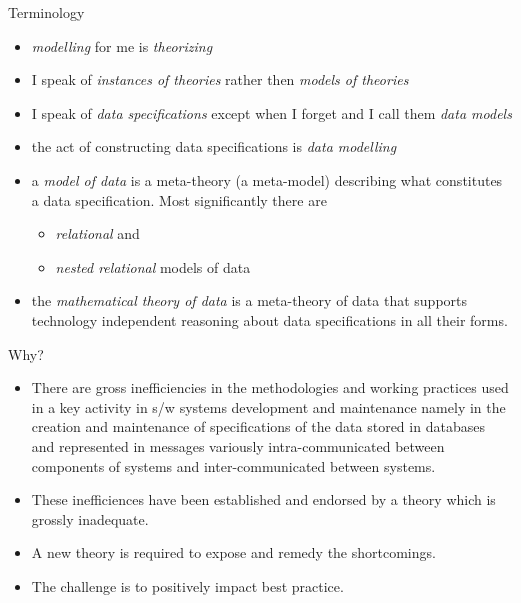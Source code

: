 \begin{frame}
\titlepage
{}
\end{frame} 


\begin{frame}{Terminology}
\begin{itemize}
\item \textit{modelling} for me is \textit{theorizing}
\item I speak of \textit{instances of theories}  rather then \textit{models of theories}
\item I speak of \textit{data specifications} except when I forget and I call them \textit{data models}
\item the act of constructing data specifications is \textit{data modelling}
\item a \textit{model of data} is a meta-theory (a meta-model) describing what constitutes a data specification. Most significantly there are
\begin{itemize}
\item \textit{relational} and 
\item \textit{nested relational} 
models of data
\end{itemize}
\item the \textit{mathematical theory of data} is a meta-theory of data that supports technology  independent reasoning about data specifications in all their forms.
\end{itemize}
\end{frame}

\begin{frame}{Why?}
\begin{itemize}[<+->]
  \item There are gross inefficiencies in the methodologies and working practices used in  a key activity in s/w systems development and maintenance namely in  the creation and maintenance of specifications of the data stored in databases and 
  represented in messages variously intra-communicated between components of systems and inter-communicated between systems. 
  \item These inefficiences have been established and endorsed by a theory which is grossly inadequate.
  \item A new theory is required to expose and remedy the shortcomings.
  \item The challenge is to positively impact best practice.
\end{itemize}
\end{frame}

